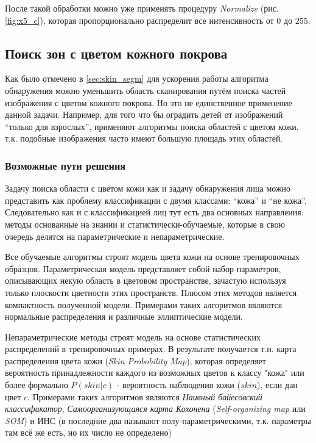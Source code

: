 \documentclass[12pt]{report}
\begin{document}
\begin{figure}[h]
	\centering
	\caption{}
	\label{fig:aggresive_normal_steps}
\end{figure}

После такой обработки можно уже применять процедуру \textit{Normalize} (рис. \ref{fig:x5_c}), которая 
пропорционально 
распределит все интенсивность от $0$ до $255$.

\subsection{Поиск зон с цветом кожного покрова}
\label{sec:skin_detection}
Как было отмечено в \ref{sec:skin_segm} для ускорения работы алгоритма обнаружения можно уменьшить область 
сканирования путём поиска частей изображения с цветом кожного покрова. Но это не единственное применение данной задачи. Например, 
для того что бы оградить детей от изображений ``только для взрослых'', применяют алгоритмы поиска областей с цветом 
кожи, т.к. подобные изображения часто имеют большую площадь этих областей. \citep{forsyth1999automatic} \citep
{zheng2004blocking}

\subsubsection{Возможные пути решения}
Задачу поиска области с цветом кожи как и задачу обнаружения лица можно представить как проблему классификации с 
двумя классами: ``кожа'' и ``не кожа''. Следовательно как и с классификацией лиц тут есть два основных направления: 
методы основанные на знании и статистически-обучаемые, которые в свою очередь делятся на параметрические и 
непараметрические. \citep{vezhnevets2003survey}

Все обучаемые алгоритмы строят модель цвета кожи на основе тренировочных образцов. Параметрическая модель 
представляет собой набор параметров, описывающих некую область в цветовом пространстве, зачастую используя только 
плоскости цветности этих пространств. Плюсом этих методов является компактность полученной модели. Примерами таких 
алгоритмов являются нормальные распределения и различные эллиптические модели.

Непараметрические методы строят модель на основе статистических распределений в тренировочных примерах. В 
результате 
получается т.н. карта распределения цвета кожи (\textit{Skin Probobility Map}), которая определяет вероятность 
принадлежности каждого из возможных цветов к классу "кожа" или более формально $P(skin|c)$ - вероятность наблюдения 
кожи ($skin$), если дан цвет $c$. Примерами таких алгоритмов являются \emph{Наивный байесовский классификатор}, 
\emph
{Самоорганизующаяся карта Кохонена} (\textit{Self-organizing map} или \textit{SOM}) и ИНС (в \citep{xu2006color} 
последние два называют полу-параметрическими, т.к. параметры там всё же есть, но их число не определено)
\end{document}
